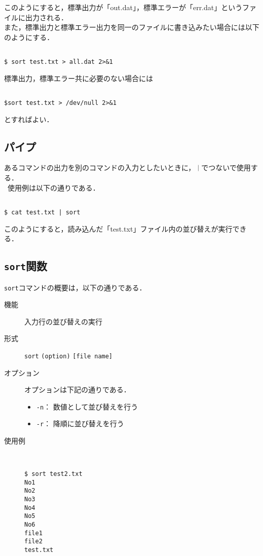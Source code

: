 \documentclass[a4j,11pt]{jarticle}
\begin{document}
このようにすると，標準出力が「out.dat」，標準エラーが「err.dat」というファイルに出力される．\\

また，標準出力と標準エラー出力を同一のファイルに書き込みたい場合には以下のようにする．
\begin{verbatim}

$ sort test.txt > all.dat 2>&1

\end{verbatim}

標準出力，標準エラー共に必要のない場合には
\begin{verbatim}

$sort test.txt > /dev/null 2>&1

\end{verbatim}

とすればよい．



\subsection{パイプ}

あるコマンドの出力を別のコマンドの入力としたいときに，\verb|｜|でつないで使用する．\\
\ 使用例は以下の通りである．

\begin{verbatim}

$ cat test.txt | sort

\end{verbatim}

このようにすると，読み込んだ「test.txt」ファイル内の並び替えが実行できる．


\subsection{\texttt{sort}関数}

\verb|sort|コマンドの概要は，以下の通りである．
\begin{description}
  \item[機能]
    入力行の並び替えの実行
  \item[形式]
    \verb|sort| \verb|(option)| \verb|[file name]|
  \item[オプション]
    オプションは下記の通りである．
    \begin{itemize}
      \item \verb|-n|：  数値として並び替えを行う
      \item \verb|-r|：  降順に並び替えを行う
    \end{itemize}
  \item[使用例]
    \begin{verbatim}


$ sort test2.txt
No1
No2
No3
No4
No5
No6
file1
file2
test.txt

    \end{verbatim}
\end{description}
\end{document}
